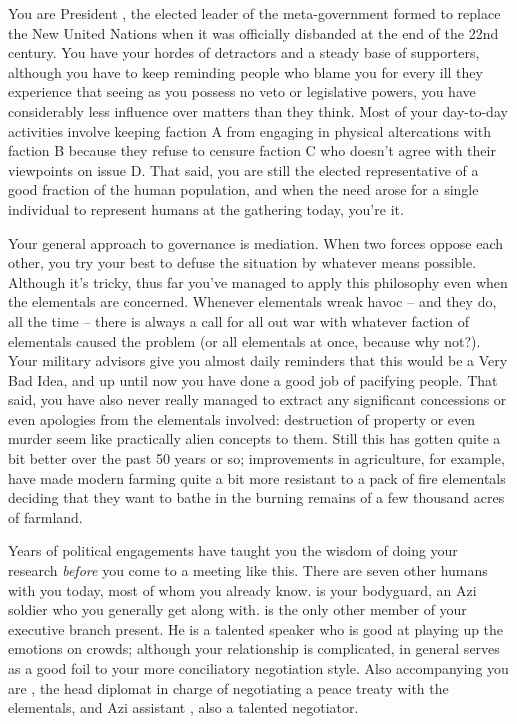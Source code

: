 \documentclass[char]{elementals}
\begin{document}
\name{\cLeader{}}

You are President \cLeader{\intro}, the elected leader of the meta-government formed to replace the New United Nations when it was officially disbanded at the end of the 22nd century. You have your hordes of detractors and a steady base of supporters, although you have to keep reminding people who blame you for every ill they experience that seeing as you possess no veto or legislative powers, you have considerably less influence over matters than they think. Most of your day-to-day activities involve keeping faction A from engaging in physical altercations with faction B because they refuse to censure faction C who doesn't agree with their viewpoints on issue D. That said, you are still the elected representative of a good fraction of the human population, and when the need arose for a single individual to represent humans at the gathering today, you're it.

Your general approach to governance is mediation. When two forces oppose each other, you try your best to defuse the situation by whatever means possible. Although it's tricky, thus far you've managed to apply this philosophy even when the elementals are concerned. Whenever elementals wreak havoc -- and they do, all the time -- there is always a call for all out war with whatever faction of elementals caused the problem (or all elementals at once, because why not?). Your military advisors give you almost daily reminders that this would be a Very Bad Idea, and up until now you have done a good job of pacifying people. That said, you have also never really managed to extract any significant concessions or even apologies from the elementals involved: destruction of property or even murder seem like practically alien concepts to them. Still this has gotten quite a bit better over the past 50 years or so; improvements in agriculture, for example, have made modern farming quite a bit more resistant to a pack of fire elementals deciding that they want to bathe in the burning remains of a few thousand acres of farmland.

Years of political engagements have taught you the wisdom of doing your research \emph{before} you come to a meeting like this. There are seven other humans with you today, most of whom you already know. \cRomeo{\intro} is your bodyguard, an Azi soldier who you generally get along with. \cDema{\intro} is the only other member of your executive branch present. He is a talented speaker who is good at playing up the emotions on crowds; although your relationship is complicated, in general \cDema{\they} serves as a good foil to your more conciliatory negotiation style. Also accompanying you are \cAvatar{\intro}, the head diplomat in charge of negotiating a peace treaty with the elementals, and \cAvatar{\their} Azi assistant \cDiplomat{\intro}, also a talented negotiator.
\end{document}

